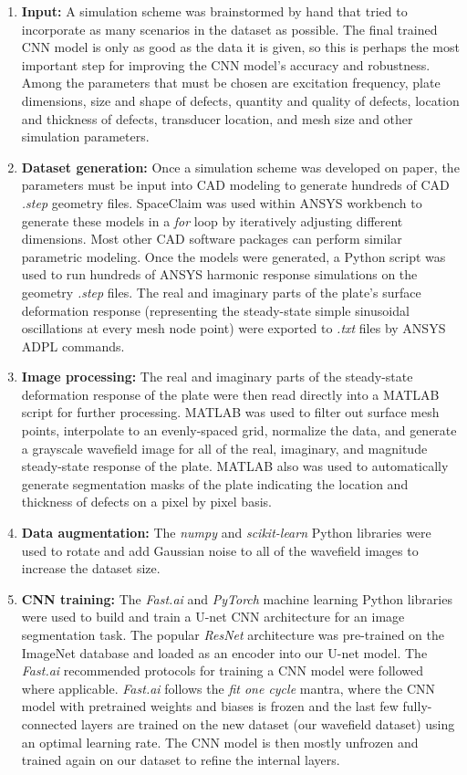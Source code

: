 \documentclass[11pt,letterpaper]{article}
\begin{document}
	\begin{enumerate}
		\item \textbf{Input:} A simulation scheme was brainstormed by hand that tried to incorporate as many scenarios in the dataset as possible. The final trained CNN model is only as good as the data it is given, so this is perhaps the most important step for improving the CNN model's accuracy and robustness. Among the parameters that must be chosen are excitation frequency, plate dimensions, size and shape of defects, quantity and quality of defects, location and thickness of defects, transducer location, and mesh size and other simulation parameters.
		
		\item \textbf{Dataset generation:} Once a simulation scheme was developed on paper, the parameters must be input into CAD modeling to generate hundreds of CAD \textit{.step} geometry files. SpaceClaim was used within ANSYS workbench to generate these models in a \textit{for} loop by iteratively adjusting different dimensions. Most other CAD software packages can perform similar parametric modeling. Once the models were generated, a Python script was used to run hundreds of ANSYS harmonic response simulations on the geometry \textit{.step} files. The real and imaginary parts of the plate's surface deformation response (representing the steady-state simple sinusoidal oscillations at every mesh node point) were exported to \textit{.txt} files by ANSYS ADPL commands.
		
		\item \textbf{Image processing:} The real and imaginary parts of the steady-state deformation response of the plate were then read directly into a MATLAB script for further processing. MATLAB was used to filter out surface mesh points, interpolate to an evenly-spaced grid, normalize the data, and generate a grayscale wavefield image for all of the real, imaginary, and magnitude steady-state response of the plate. MATLAB also was used to automatically generate segmentation masks of the plate indicating the location and thickness of defects on a pixel by pixel basis.
		
		\item \textbf{Data augmentation:} The \textit{numpy} and \textit{scikit-learn} Python libraries were used to rotate and add Gaussian noise to all of the wavefield images to increase the dataset size.
		
		\item \textbf{CNN training:} The \textit{Fast.ai} and \textit{PyTorch} machine learning Python libraries were used to build and train a U-net CNN architecture for an image segmentation task. The popular \textit{ResNet} architecture was pre-trained on the ImageNet database and loaded as an encoder into our U-net model. The \textit{Fast.ai} recommended protocols for training a CNN model were followed where applicable. \textit{Fast.ai} follows the \textit{fit one cycle} mantra, where the CNN model with pretrained weights and biases is frozen and the last few fully-connected layers are trained on the new dataset (our wavefield dataset) using an optimal learning rate. The CNN model is then mostly unfrozen and trained again on our dataset to refine the internal layers.
		

\end{enumerate}
\end{document}
